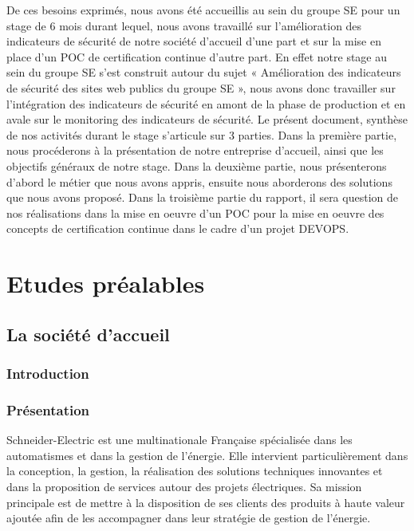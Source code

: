 \documentclass[a4paper,12pt]{book}
\theoremstyle{break}
\begin{document}
De ces besoins exprimés, nous avons été accueillis au sein du groupe SE pour un stage de 6 mois durant lequel, nous avons travaillé sur l’amélioration des indicateurs de sécurité de notre société d'accueil d'une part et sur la mise en place d'un POC de certification continue d'autre part. 
\newline En effet notre stage au sein du groupe SE s’est construit autour du sujet « Amélioration des indicateurs de sécurité des sites web publics du groupe SE », nous avons donc travailler sur l’intégration des indicateurs de sécurité en amont de la phase de production et en avale sur le monitoring des indicateurs de sécurité. 
\newline Le présent document, synthèse de nos activités durant le stage s’articule sur 3 parties. 
Dans la première partie, nous procéderons à la présentation de notre entreprise d’accueil, ainsi que les objectifs généraux de notre stage. 
\newline
Dans la deuxième partie, nous présenterons d'abord le métier que nous avons appris, ensuite nous aborderons des solutions que nous avons proposé. 
\newline
Dans la troisième partie du rapport, il sera question de nos réalisations dans la mise en oeuvre d'un \ac{POC} pour la mise en oeuvre des concepts de certification continue dans le cadre d'un projet \ac{DEVOPS}.

\part{Etudes préalables }
\chapter{La société d'accueil}
\section*{Introduction}
\section{Présentation}
Schneider-Electric est une multinationale Française spécialisée dans les automatismes et dans la gestion de l’énergie.\newline 
Elle intervient particulièrement dans la conception, la gestion, la réalisation des solutions techniques innovantes et dans la proposition de services autour des projets électriques. \newline
Sa mission principale est de mettre à la disposition de ses clients des produits à haute valeur ajoutée afin de les accompagner dans leur stratégie de gestion de l’énergie.\newline
\end{document}
